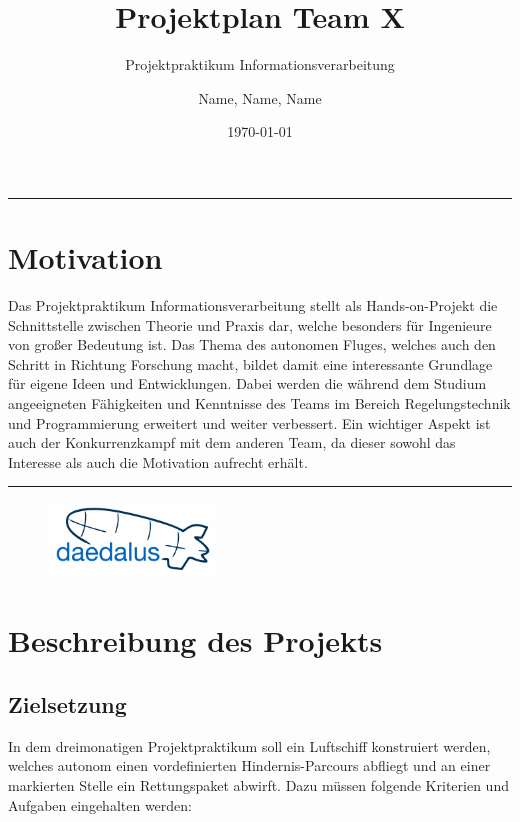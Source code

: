 \documentclass[lang=ngerman,inputenc=utf8,fontsize=10pt]{ldvarticle}
\title{Projektplan Team X}
\subtitle{Projektpraktikum Informationsverarbeitung}
\author{Name, Name, Name}
\date{\today}
\begin{document}
	\maketitle	
	\thispagestyle{empty}

\hrule

\section*{Motivation}

Das Projektpraktikum Informationsverarbeitung stellt als Hands-on-Projekt die Schnittstelle zwischen Theorie und Praxis dar, welche besonders für Ingenieure von großer Bedeutung ist.
Das Thema des autonomen Fluges, welches auch den Schritt in Richtung Forschung macht, bildet damit eine interessante Grundlage für eigene Ideen und Entwicklungen. 
Dabei werden die während dem Studium angeeigneten Fähigkeiten und Kenntnisse des Teams im Bereich Regelungstechnik und Programmierung erweitert und weiter verbessert. 
Ein wichtiger Aspekt ist auch der  Konkurrenzkampf mit dem anderen Team, da dieser sowohl das Interesse als auch die Motivation aufrecht erhält.   




\vspace*{1cm}
\hrule


\begin{figure}[!b]
\centering
\includegraphics[width=0.4\textwidth]{logo_kl.png}
\end{figure}

\newpage


\section{Beschreibung des Projekts}

\subsection*{Zielsetzung}
In dem dreimonatigen Projektpraktikum soll ein Luftschiff konstruiert werden, welches autonom einen vordefinierten Hindernis-Parcours abfliegt und an einer markierten Stelle ein Rettungspaket abwirft. Dazu müssen folgende Kriterien und Aufgaben eingehalten werden:
\end{document}
